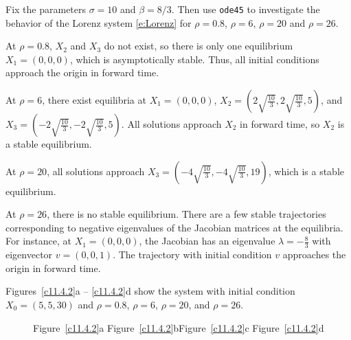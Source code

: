 \documentclass{ximera}
\begin{document}
\begin{computerExercise} \label{c11.4.2}
Fix the parameters $\sigma=10$ and $\beta = 8/3$.  Then
use {\tt ode45} to investigate the behavior of the Lorenz system
\eqref{e:Lorenz} for $\rho=0.8$, $\rho=6$, $\rho=20$ and $\rho=26$.

\begin{solution}

At $\rho = 0.8$, $X_2$ and $X_3$ do not exist, so there is only one
equilibrium $X_1 = (0,0,0)$, which is asymptotically stable.  Thus, all
initial conditions approach the origin in forward time.

\para At $\rho = 6$, there exist equilibria at $X_1 = (0,0,0)$, $X_2 =
(2\sqrt{\frac{10}{3}}, 2\sqrt{\frac{10}{3}}, 5)$, and
$X_3 = (-2\sqrt{\frac{10}{3}}, -2\sqrt{\frac{10}{3}}, 5)$.  All solutions
approach $X_2$ in forward time, so $X_2$ is a stable equilibrium.

\para At $\rho = 20$, all solutions approach $X_3 = (-4\sqrt{\frac{10}{3}},
-4\sqrt{\frac{10}{3}}, 19)$, which is a stable equilibrium.

\para At $\rho = 26$, there is no stable equilibrium.  There are a few
stable trajectories corresponding to negative eigenvalues of the Jacobian
matrices at the equilibria.  For instance, at $X_1 = (0,0,0)$, the Jacobian
has an eigenvalue $\lambda = -\frac{8}{3}$ with eigenvector $v = (0,0,1)$.
The trajectory with initial condition $v$ approaches the origin in forward
time.

\para Figures~\ref{c11.4.2}a -- \ref{c11.4.2}d show the system with
initial condition $X_0 = (5,5,30)$ and $\rho = 0.8$, $\rho = 6$, $\rho = 20$,
and $\rho = 26$.

\begin{figure}[htb]
                       \centerline{%
                       }
		\centerline{Figure~\ref{c11.4.2}a\hspace{0.8in}
        	Figure~\ref{c11.4.2}b\hspace{0.8in}Figure~\ref{c11.4.2}c
        	\hspace{0.8in}Figure~\ref{c11.4.2}d}
\end{figure}


\end{solution}
\end{computerExercise}
\end{document}
